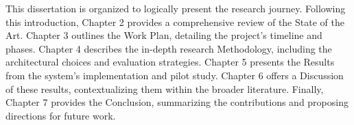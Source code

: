 This dissertation is organized to logically present the research journey. Following this introduction, Chapter 2 provides a comprehensive review of the State of the Art. Chapter 3 outlines the Work Plan, detailing the project's timeline and phases. Chapter 4 describes the in-depth research Methodology, including the architectural choices and evaluation strategies. Chapter 5 presents the Results from the system's implementation and pilot study. Chapter 6 offers a Discussion of these results, contextualizing them within the broader literature. Finally, Chapter 7 provides the Conclusion, summarizing the contributions and proposing directions for future work. 